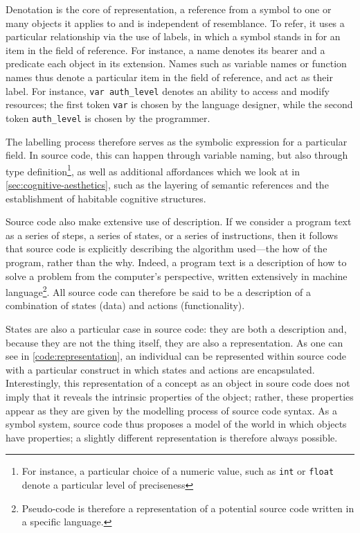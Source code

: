 Denotation is the core of representation, a reference from a symbol to one or many objects it applies to and is independent of resemblance. To refer, it uses a particular relationship via the use of labels, in which a symbol stands in for an item in the field of reference. For instance, a name denotes its bearer and a predicate each object in its extension. Names such as variable names or function names thus denote a particular item in the field of reference, and act as their label. For instance, \lstinline{var auth_level} denotes an ability to access and modify resources; the first token \lstinline{var} is chosen by the language designer, while the second token \lstinline{auth_level} is chosen by the programmer.

The labelling process therefore serves as the symbolic expression for a particular field. In source code, this can happen through variable naming, but also through type definition\footnote{For instance, a particular choice of a numeric value, such as \lstinline{int} or \lstinline{float} denote a particular level of preciseness}, as well as additional affordances which we look at in \ref{sec:cognitive-aesthetics}, such as the layering of semantic references and the establishment of habitable cognitive structures.

Source code also make extensive use of description. If we consider a program text as a series of steps, a series of states, or a series of instructions, then it follows that source code is explicitly describing the algorithm used—the how of the program, rather than the why. Indeed, a program text is a description of how to solve a problem from the computer's perspective, written extensively in machine language\footnote{Pseudo-code is therefore a representation of a potential source code written in a specific language.}. All source code can therefore be said to be a description of a combination of states (data) and actions (functionality).

States are also a particular case in source code: they are both a description and, because they are not the thing itself, they are also a representation. As one can see in \ref{code:representation}, an individual can be represented within source code with a particular construct in which states and actions are encapsulated. Interestingly, this representation of a concept as an object in soure code does not imply that it reveals the intrinsic properties of the object; rather, these properties appear as they are given by the modelling process of source code syntax. As a symbol system, source code thus proposes a model of the world in which objects have properties; a slightly different representation is therefore always possible.

